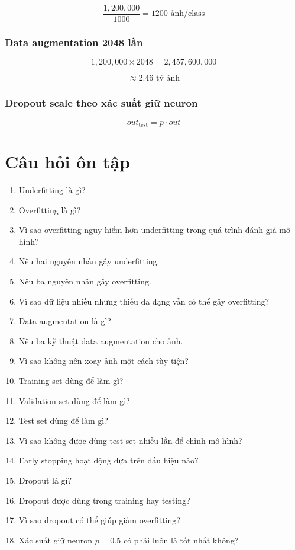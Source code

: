 \documentclass[12pt,a4paper]{report}
\begin{document}
\[
    \frac{1,200,000}{1000}=1200 \text{ ảnh/class}
\]

\subsection*{Data augmentation 2048 lần}

\[
    1,200,000 \times 2048
    =
    2,457,600,000
\]

\[
    \approx 2.46 \text{ tỷ ảnh}
\]

\subsection*{Dropout scale theo xác suất giữ neuron}

\[
    out_{\text{test}} = p \cdot out
\]

\chapter{Câu hỏi ôn tập}

\begin{enumerate}
    \item Underfitting là gì?
    \item Overfitting là gì?
    \item Vì sao overfitting nguy hiểm hơn underfitting trong quá trình đánh giá mô hình?
    \item Nêu hai nguyên nhân gây underfitting.
    \item Nêu ba nguyên nhân gây overfitting.
    \item Vì sao dữ liệu nhiều nhưng thiếu đa dạng vẫn có thể gây overfitting?
    \item Data augmentation là gì?
    \item Nêu ba kỹ thuật data augmentation cho ảnh.
    \item Vì sao không nên xoay ảnh một cách tùy tiện?
    \item Training set dùng để làm gì?
    \item Validation set dùng để làm gì?
    \item Test set dùng để làm gì?
    \item Vì sao không được dùng test set nhiều lần để chỉnh mô hình?
    \item Early stopping hoạt động dựa trên dấu hiệu nào?
    \item Dropout là gì?
    \item Dropout được dùng trong training hay testing?
    \item Vì sao dropout có thể giúp giảm overfitting?
    \item Xác suất giữ neuron $p=0.5$ có phải luôn là tốt nhất không?
\end{enumerate}
\end{document}
